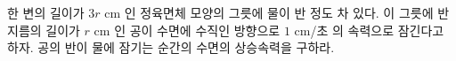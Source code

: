 한 변의 길이가 $3r$ cm 인 정육면체 모양의 그릇에 물이 반 정도 차 있다. 
이 그릇에 반지름의 길이가 $r $ cm 인 공이 
수면에 수직인 방향으로 $1$ cm/초 의 속력으로 잠긴다고 하자. 
공의 반이 물에 잠기는 순간의 수면의 상승속력을 구하라.   